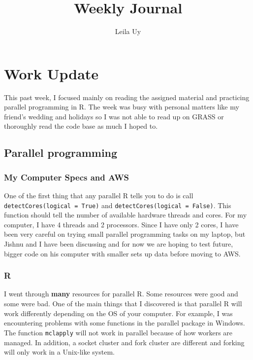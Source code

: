 \documentclass[a4paper,10pt]{article}
\title{Weekly Journal}
\author{Leila Uy}
\begin{document}
\maketitle

% 

\section{Work Update}

This past week, I focused mainly on reading the assigned material and practicing parallel programming in R. The week was busy with personal 
matters like my friend's wedding and holidays so I was not able to read up on GRASS or thoroughly read the code base as much I hoped to.

\subsection{Parallel programming}

\subsubsection{My Computer Specs and AWS}
One of the first thing that any parallel R tells you to do is call \verb|detectCores(logical = True)| and \verb|detectCores(logical = False)|.
This function should tell the number of available hardware threads and cores. For my computer, I have 4 threads and 2 processors. 
Since I have only 2 cores, I have been very careful on trying small parallel programming tasks on my laptop, but Jishnu and I have 
been discussing and for now we are hoping to test future, bigger code on his computer with smaller sets up data before moving to AWS. 

\subsubsection{R}
I went through \textbf{many} resources for parallel R. Some resources were good and some were bad. One of the main things that I discovered 
is that parallel R will work differently depending on the OS of your computer. For example, I was encountering problems with some functions 
in the parallel package in Windows. The function \verb|mclapply| will not work in parallel because of how workers are managed. In addition, 
a socket cluster and fork cluster are different and forking will only work in a Unix-like system.
\end{document}
